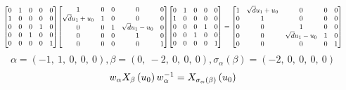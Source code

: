 \documentclass[11pt]{article}
\theoremstyle{definition}
\begin{document}
\[
\scaletoalign{\textwidth}{{\left[\begin{matrix}0 & 1 & 0 & 0 & 0\\1 & 0 & 0 & 0 & 0\\0 & 0 & 0 & 1 & 0\\0 & 0 & 1 & 0 & 0\\0 & 0 & 0 & 0 & 1\end{matrix}\right]} {\left[\begin{matrix}1 & 0 & 0 & 0 & 0\\\sqrt{d} u_{1} + u_{0} & 1 & 0 & 0 & 0\\0 & 0 & 1 & \sqrt{d} u_{1} - u_{0} & 0\\0 & 0 & 0 & 1 & 0\\0 & 0 & 0 & 0 & 1\end{matrix}\right]} {\left[\begin{matrix}0 & 1 & 0 & 0 & 0\\1 & 0 & 0 & 0 & 0\\0 & 0 & 0 & 1 & 0\\0 & 0 & 1 & 0 & 0\\0 & 0 & 0 & 0 & 1\end{matrix}\right]} = {\left[\begin{matrix}1 & \sqrt{d} u_{1} + u_{0} & 0 & 0 & 0\\0 & 1 & 0 & 0 & 0\\0 & 0 & 1 & 0 & 0\\0 & 0 & \sqrt{d} u_{1} - u_{0} & 1 & 0\\0 & 0 & 0 & 0 & 1\end{matrix}\right]}}
\]
\[
\alpha = \left( -1, \  1, \  0, \  0, \  0\right), \beta = \left( 0, \  -2, \  0, \  0, \  0\right), \sigma_{\alpha}(\beta) = \left( -2, \  0, \  0, \  0, \  0\right)
\]
\[
\scaletoalign{\textwidth}{w_{\alpha} X_{\beta}\left(u_{0}\right) w_{\alpha}^{-1} = X_{\sigma_{\alpha}\left(\beta\right)}\left(u_{0}\right)}
\]
\end{document}
